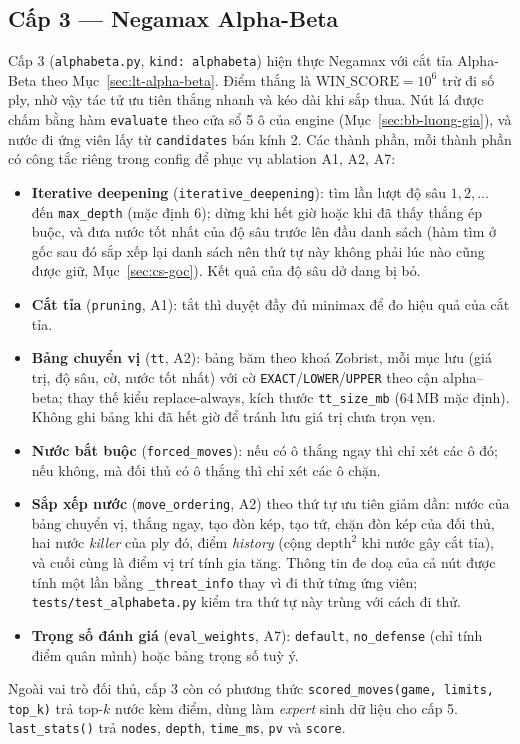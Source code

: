 \subsection{Cấp 3 --- Negamax Alpha-Beta}
Cấp 3 (\texttt{alphabeta.py}, \texttt{kind: alphabeta}) hiện thực Negamax với cắt tỉa Alpha-Beta theo Mục~\ref{sec:lt-alpha-beta}. Điểm thắng là $\text{WIN\_SCORE}=10^6$ trừ đi số ply, nhờ vậy tác tử ưu tiên thắng nhanh và kéo dài khi sắp thua. Nút lá được chấm bằng hàm \texttt{evaluate} theo cửa sổ 5 ô của engine (Mục~\ref{sec:bb-luong-gia}), và nước đi ứng viên lấy từ \texttt{candidates} bán kính 2. Các thành phần, mỗi thành phần có công tắc riêng trong config để phục vụ ablation A1, A2, A7:
\begin{itemize}
  \item \textbf{Iterative deepening} (\texttt{iterative\_deepening}): tìm lần lượt độ sâu $1,2,\dots$ đến \texttt{max\_depth} (mặc định 6); dừng khi hết giờ hoặc khi đã thấy thắng ép buộc, và đưa nước tốt nhất của độ sâu trước lên đầu danh sách (hàm tìm ở gốc sau đó sắp xếp lại danh sách nên thứ tự này không phải lúc nào cũng được giữ, Mục~\ref{sec:cs-goc}). Kết quả của độ sâu dở dang bị bỏ.
  \item \textbf{Cắt tỉa} (\texttt{pruning}, A1): tắt thì duyệt đầy đủ minimax để đo hiệu quả của cắt tỉa.
  \item \textbf{Bảng chuyển vị} (\texttt{tt}, A2): bảng băm theo khoá Zobrist, mỗi mục lưu (giá trị, độ sâu, cờ, nước tốt nhất) với cờ \texttt{EXACT}/\texttt{LOWER}/\texttt{UPPER} theo cận alpha--beta; thay thế kiểu replace-always, kích thước \texttt{tt\_size\_mb} (64\,MB mặc định). Không ghi bảng khi đã hết giờ để tránh lưu giá trị chưa trọn vẹn.
  \item \textbf{Nước bắt buộc} (\texttt{forced\_moves}): nếu có ô thắng ngay thì chỉ xét các ô đó; nếu không, mà đối thủ có ô thắng thì chỉ xét các ô chặn.
  \item \textbf{Sắp xếp nước} (\texttt{move\_ordering}, A2) theo thứ tự ưu tiên giảm dần: nước của bảng chuyển vị, thắng ngay, tạo đòn kép, tạo tứ, chặn đòn kép của đối thủ, hai nước \emph{killer} của ply đó, điểm \emph{history} (cộng $\text{depth}^2$ khi nước gây cắt tỉa), và cuối cùng là điểm vị trí tính gia tăng. Thông tin đe doạ của cả nút được tính một lần bằng \texttt{\_threat\_info} thay vì đi thử từng ứng viên; \texttt{tests/test\_alphabeta.py} kiểm tra thứ tự này trùng với cách đi thử.
  \item \textbf{Trọng số đánh giá} (\texttt{eval\_weights}, A7): \texttt{default}, \texttt{no\_defense} (chỉ tính điểm quân mình) hoặc bảng trọng số tuỳ ý.
\end{itemize}
Ngoài vai trò đối thủ, cấp 3 còn có phương thức \texttt{scored\_moves(game, limits, top\_k)} trả top-$k$ nước kèm điểm, dùng làm \emph{expert} sinh dữ liệu cho cấp 5. \texttt{last\_stats()} trả \texttt{nodes}, \texttt{depth}, \texttt{time\_ms}, \texttt{pv} và \texttt{score}.
